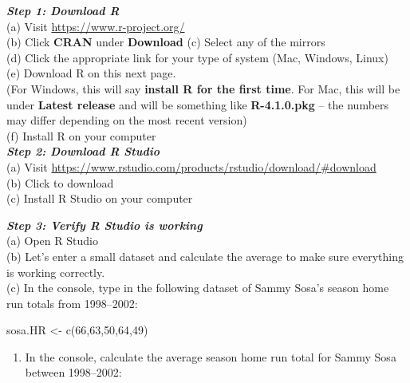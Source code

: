 \documentclass[
  11pt,
]{book}
\newenvironment{Shaded}{\begin{snugshade}}{\end{snugshade}}
\newcommand{\DecValTok}[1]{\textcolor[rgb]{0.00,0.00,0.81}{#1}}
\newcommand{\FunctionTok}[1]{\textcolor[rgb]{0.00,0.00,0.00}{#1}}
\newcommand{\NormalTok}[1]{#1}
\newcommand{\OtherTok}[1]{\textcolor[rgb]{0.56,0.35,0.01}{#1}}
\providecommand{\tightlist}{%
  \setlength{\itemsep}{0pt}\setlength{\parskip}{0pt}}
\theoremstyle{definition}
\theoremstyle{definition}
\theoremstyle{definition}
\theoremstyle{definition}
\theoremstyle{remark}
\begin{document}
\textbf{\emph{Step 1: Download R}}\\
(a) Visit \url{https://www.r-project.org/}\\
(b) Click \textbf{CRAN} under \textbf{Download}
(c) Select any of the mirrors\\
(d) Click the appropriate link for your type of system (Mac, Windows, Linux)\\
(e) Download R on this next page.\\
(For Windows, this will say \textbf{install R for the first time}. For Mac, this will be under \textbf{Latest release} and will be something like \textbf{R-4.1.0.pkg} -- the numbers may differ depending on the most recent version)\\
(f) Install R on your computer\\

\textbf{\emph{Step 2: Download R Studio}}\\
(a) Visit \url{https://www.rstudio.com/products/rstudio/download/\#download}\\
(b) Click to download\\
(c) Install R Studio on your computer\\

\newpage

\textbf{\emph{Step 3: Verify R Studio is working}}\\
(a) Open R Studio\\
(b) Let's enter a small dataset and calculate the average to make sure everything is working correctly.\\
(c) In the console, type in the following dataset of Sammy Sosa's season home run totals from 1998--2002:\\

\begin{Shaded}
\begin{Highlighting}[]
\NormalTok{sosa.HR }\OtherTok{\textless{}{-}} \FunctionTok{c}\NormalTok{(}\DecValTok{66}\NormalTok{,}\DecValTok{63}\NormalTok{,}\DecValTok{50}\NormalTok{,}\DecValTok{64}\NormalTok{,}\DecValTok{49}\NormalTok{)}
\end{Highlighting}
\end{Shaded}

\begin{enumerate}
\def\labelenumi{(\alph{enumi})}
\setcounter{enumi}{3}
\tightlist
\item
  In the console, calculate the average season home run total for Sammy Sosa between 1998--2002:\\
\end{enumerate}
\end{document}
